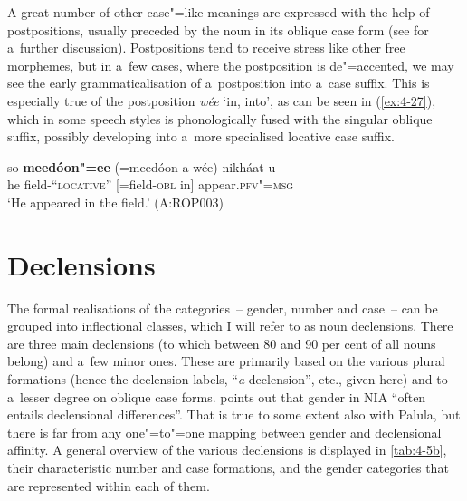 A great number of other case"=like meanings are expressed with the help of postpositions, usually
preceded by the noun in its oblique case form (see  for a~further discussion). Postpositions
tend to receive stress like other free morphemes, but in a~few cases, where the postposition is
de"=accented, we may see the early grammaticalisation of a~postposition into a~case suffix. This is
especially true of the postposition \textit{wée} `in, into', as can be seen in (\ref{ex:4-27}),
which in some speech styles is phonologically fused with the singular oblique suffix, possibly
developing into a~more specialised locative case suffix.

\begin{exe}
\ex
\label{ex:4-27}
 \gll so \textbf{meedóon"=ee} (=meedóon-a wée) nikháat-u \\
	he field\textsc{-``locative''} [=field-\textsc{obl} in] appear.\textsc{pfv"=msg} \\
\glt `He appeared in the field.' (A:ROP003)
\end{exe}

\section{Declensions}
\label{sec:4-6}

  The formal realisations of the categories~-- gender, number and case~-- can be grouped into
  inflectional classes, which I will refer to as noun declensions. There are three main declensions (to which between 80 and 90 per cent of all nouns belong)
  and a~few minor ones. These are primarily
  based on the various plural formations (hence the
  declension labels, ``\textit{a}-declension'', etc., given here) and to a~lesser degree on oblique
  case forms. \citet[219]{masica1991} points out that gender in NIA ``often entails declensional
  differences''. That is true to some extent also with Palula, but there is far from any one"=to"=one
  mapping between gender and declensional affinity. A general overview of the various declensions is displayed in \ref{tab:4-5b}, their characteristic number and case formations, and the gender categories that are represented within each of them.  


